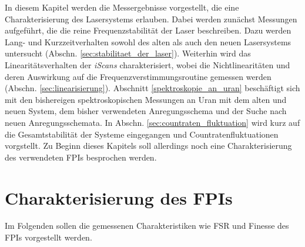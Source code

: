 In diesem Kapitel werden die Messergebnisse vorgestellt, die eine
Charakterisierung des Lasersystems erlauben. Dabei werden zunächst Messungen
aufgeführt, die die reine Frequenzstabilität der Laser beschreiben. Dazu werden
Lang- und Kurzzeitverhalten sowohl des alten als auch den neuen Lasersystems
untersucht (Abschn. \ref{sec:stabilitaet_der_laser}). Weiterhin wird das
Linearitätsverhalten der \textit{iScans} charakterisiert, wobei die
Nichtlinearitäten und deren Auswirkung auf die
Frequenzverstimmungsroutine gemessen werden (Abschn.
\ref{sec:linearisierung}). Abschnitt \ref{spektroskopie_an_uran} beschäftigt
sich mit den bishereigen spektroskopischen Messungen an Uran mit dem alten und
neuen System, dem bisher verwendeten Anregungsschema und der Suche nach neuen
Anregungsschemata. In Abschn. \ref{sec:countraten_fluktuation} wird kurz auf die
Gesamtstabilität der Systeme eingegangen und Countratenfluktuationen vorgstellt.
Zu Beginn dieses Kapitels soll allerdings noch eine Charakterisierung des
verwendeten FPIs besprochen werden.

\section{Charakterisierung des FPIs}\label{sec:charakterisierung_FPI}
Im Folgenden sollen die gemessenen Charakteristiken wie FSR und Finesse des FPIs
vorgestellt werden.

